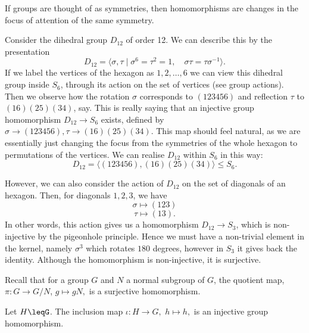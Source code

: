 \begin{remark} 
  If groups are thought of as symmetries, then homomorphisms are changes in the focus of
  attention of the same symmetry.
\end{remark}

\begin{example}
  Consider the dihedral group $D_{12}$ of order 12. We can describe this by the presentation
  \[D_{12}=\langle \sigma, \tau \mid \sigma^{6}=\tau^2=1, \quad \sigma\tau = \tau\sigma^{-1}\rangle .\]
  If we label the vertices of the hexagon as $1,2,\ldots,6$ we can view this dihedral
  group inside $S_6$, through its action on the set of vertices (see group actions). Then
  we observe how the rotation $\sigma$ corresponds to $(1 2 3 4 5 6)$ and reflection
  $\tau$ to $(1 6)(2 5)(3 4)$, say. This is really saying that an injective group
  homomorphism $D_{12}\to S_6$ exists, defined by $\sigma\to (1 2 3 4 5 6), \tau\to
  (1 6)(2 5)(3 4)$.
  This map should feel natural, as we are essentially just changing the focus from the symmetries of the whole hexagon to permutations of the vertices.
  We can realise $D_{12}$ within $S_6$ in this way: 
  \[D_{12}=\langle (1 2 3 4 5 6),(1 6)(2 5)(3 4)\rangle \leq S_6.\]

  However, we can also consider the action of $D_{12}$ on the set of diagonals of an
  hexagon. Then, for diagonals $1,2,3$, we have 
  \[\sigma\mapsto (1 2 3)\]
  \[\tau\mapsto (1 3).\]
  In other words, this action gives us a homomorphism $D_{12}\to S_3$, which is non-injective
  by the pigeonhole principle. Hence we must have a non-trivial element in the kernel, namely $\sigma^3$ which
  rotates $180$ degrees, however in $S_3$ it gives back the identity. Although the
  homomorphism is non-injective, it is surjective. 
  \label{D12}
\end{example}

\begin{example}
  Recall that for a group $G$ and $N$ a normal subgroup of $G$, the quotient map, $\pi:G\to G/N$,  $g\mapsto gN,$ is a surjective homomorphism.

  Let $H\leqG$. The inclusion map $\iota: H\to G,$ $h\mapsto h,$ is an injective group homomorphism. 
\end{example}


